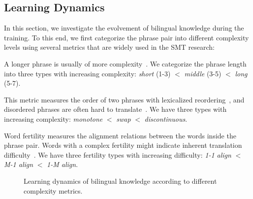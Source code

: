 \documentclass[11pt,a4paper]{article}
\begin{document}
\subsection{Learning Dynamics}
\label{sec:learning_dynamics}

In this section, we investigate the evolvement of bilingual knowledge during the training. To this end, we first categorize the phrase pair into different complexity levels using several metrics that are widely used in the SMT research:

\vspace{5pt}
 A longer phrase is usually of more complexity~\cite{lu2010automatic}. We categorize the phrase length into three types with increasing complexity: {\em short} (1-3) $<$ {\em middle} (3-5) $<$ {\em long} (5-7).
    

\vspace{5pt}    
This metric measures the order of two phrases with lexicalized reordering~\cite{tillmann:2004:naacl}, and disordered phrases are often hard to translate~\cite{koehn2009statistical}. We have three types with increasing complexity: {\em monotone} $<$ {\em swap} $<$ {\em discontinuous}.


\vspace{5pt}    
 Word fertility measures the alignment relations between the words inside the phrase pair. Words with a complex fertility might indicate inherent translation difficulty~\cite{brown1990statistical}. We have three fertility types with increasing difficulty: {\em 1-1 align} $<$ {\em M-1 align} $<$ {\em 1-M align}. 



\begin{figure}[t]
    \centering
     \hfill
      \hfill
\caption{Learning dynamics of bilingual knowledge according to different complexity metrics.}
\label{fig:learning-dynamics}
\end{figure}
\end{document}
